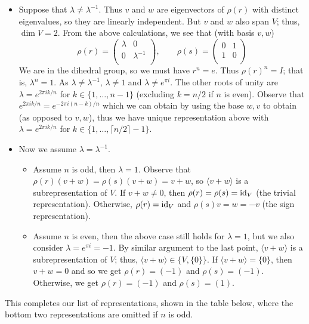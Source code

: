 \begin{itemize}
  \item Suppose that $\lambda \neq \lambda^{-1}$. Thus $v$ and $w$ are eigenvectors of $\rho(r)$ with distinct eigenvalues, so they are linearly independent. But $v$ and $w$ also span $V$; thus, $\dim V = 2$. From the above calculations, we see that (with basis $v, w$)
        \[
          \rho(r) =
          \begin{pmatrix}
            \lambda & 0            \\
            0       & \lambda^{-1} \\
          \end{pmatrix},\qquad
          \rho(s) =
          \begin{pmatrix}
            0 & 1 \\
            1 & 0 \\
          \end{pmatrix}
        \]
        We are in the dihedral group, so we must have $r^n = e$. Thus $\rho(r)^n = I$; that is, $\lambda^n = 1$. As $\lambda \neq \lambda^{-1}$, $\lambda \neq 1$ and $\lambda \neq e^{\pi i}$. The other roots of unity are $\lambda = e^{2\pi ik/n}$ for $k \in \{1, \ldots, n-1\}$ (excluding $k = n/2$ if $n$ is even). Observe that $e^{2\pi ik/n} = e^{-2\pi i(n-k)/n}$ which we can obtain by using the base $w, v$ to obtain (as opposed to $v, w$), thus we have unique representation above with $\lambda = e^{2\pi ik/n}$ for $k \in \{1, \ldots, \lceil n/2 \rceil - 1\}$.
  \item Now we assume $\lambda = \lambda^{-1}$.
        \begin{itemize}
          \item Assume $n$ is odd, then $\lambda = 1$. Observe that $\rho(r)(v+w) = \rho(s)(v+w)=v+w$, so $\langle v + w \rangle$ is a subrepresentation of $V$. If $v + w \neq 0$, then $\rho(r) = \rho(s) = \operatorname{id}_V$ (the trivial representation). Otherwise, $\rho(r) = \operatorname{id}_V$ and $\rho(s)v = w = -v$ (the sign representation).
          \item Assume $n$ is even, then the above case still holds for $\lambda = 1$, but we also consider $\lambda = e^{\pi i} = -1$. By similar argument to the last point, $\langle v + w \rangle$ is a subrepresentation of $V$; thus, $\langle v + w \rangle \in \{V, \{0\}\}$. If $\langle v + w \rangle = \{0\}$, then $v + w = 0$ and so we get $\rho(r) = (-1)$ and $\rho(s) = (-1)$. Otherwise, we get $\rho(r) = (-1)$ and $\rho(s) = (1)$.
        \end{itemize}
\end{itemize}
This completes our list of representations, shown in the table below, where the bottom two representations are omitted if $n$ is odd.

